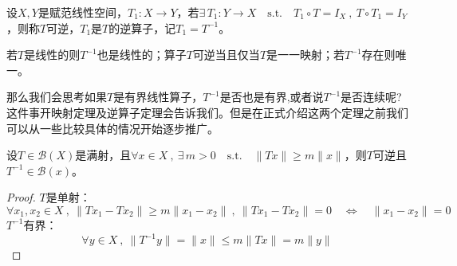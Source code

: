 \begin{definition}[逆算子]
设$X,Y$是赋范线性空间，$T_1:X \to Y$，若$\exists \, T_1:Y \to X \quad \text{s.t.} \quad T_1 \circ T=I_X \ , \ T \circ T_1=I_Y$，则称$T$可逆，$T_1$是$T$的逆算子，记$T_1=T^{-1}$。
\end{definition}
\begin{remark} \quad 
若$T$是线性的则$T^{-1}$也是线性的；算子$T$可逆当且仅当$T$是一一映射；若$T^{-1}$存在则唯一。
\end{remark}

那么我们会思考如果$T$是有界线性算子，$T^{-1}$是否也是有界,或者说$T^{-1}$是否连续呢?这件事开映射定理及逆算子定理会告诉我们。但是在正式介绍这两个定理之前我们可以从一些比较具体的情况开始逐步推广。
\begin{theorem}\label{theorem:nys}
设$T \in \mathscr{B}(X)$是满射，且$\forall x \in X \ , \ \exists \, m>0 \quad \text{s.t.} \quad \|Tx\| \geq m\|x\|$，则$T$可逆且$T^{-1} \in \mathscr{B}(x)$。
\end{theorem} 
\begin{proof}
$T$是单射：
\[\forall x_1,x_2 \in X \ , \ \|Tx_1-Tx_2\| \geq m\|x_1-x_2\| \ , \ \|Tx_1-Tx_2\|=0 \quad \Leftrightarrow \quad \|x_1-x_2\|=0\]
$T^{-1}$有界：
\[\forall y \in X \ , \ \|T^{-1}y\|=\|x\| \leq m\|Tx\|=m\|y\|\]
\end{proof}

